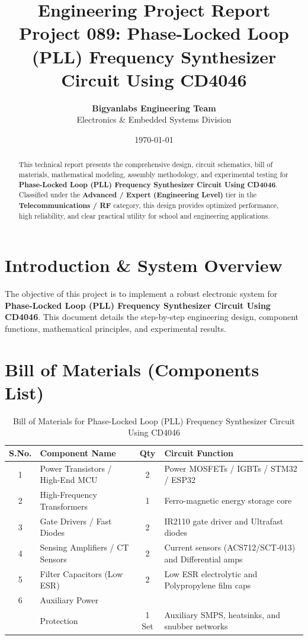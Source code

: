 \documentclass[11pt,a4paper]{article}
\title{\textbf{\Huge Engineering Project Report}\\[0.5em] \Large Project 089: Phase-Locked Loop (PLL) Frequency Synthesizer Circuit Using CD4046}
\author{\textbf{Bigyanlabs Engineering Team}\\ Electronics \& Embedded Systems Division}
\date{\today}
\begin{document}
\maketitle
\thispagestyle{empty}

\begin{abstract}
This technical report presents the comprehensive design, circuit schematics, bill of materials, mathematical modeling, assembly methodology, and experimental testing for \textbf{Phase-Locked Loop (PLL) Frequency Synthesizer Circuit Using CD4046}. Classified under the \textbf{Advanced / Expert (Engineering Level)} tier in the \textbf{Telecommunications / RF} category, this design provides optimized performance, high reliability, and clear practical utility for school and engineering applications.
\end{abstract}

\newpage
\tableofcontents
\newpage

\section{Introduction \& System Overview}
The objective of this project is to implement a robust electronic system for \textbf{Phase-Locked Loop (PLL) Frequency Synthesizer Circuit Using CD4046}. This document details the step-by-step engineering design, component functions, mathematical principles, and experimental results.

\section{Bill of Materials (Components List)}
\begin{table}[h!]
\centering
\caption{Bill of Materials for Phase-Locked Loop (PLL) Frequency Synthesizer Circuit Using CD4046}
\vspace{0.5em}
\begin{tabular}{clcp{7cm}}
\toprule
\textbf{S.No.} & \textbf{Component Name} & \textbf{Qty} & \textbf{Circuit Function} \\
\midrule
1 & Power Transistors / High-End MCU & 2 & Power MOSFETs / IGBTs / STM32 / ESP32 \\
2 & High-Frequency Transformers & 1 & Ferro-magnetic energy storage core \\
3 & Gate Drivers / Fast Diodes & 2 & IR2110 gate driver and Ultrafast diodes \\
4 & Sensing Amplifiers / CT Sensors & 2 & Current sensors (ACS712/SCT-013) and Differential amps \\
5 & Filter Capacitors (Low ESR) & 2 & Low ESR electrolytic and Polypropylene film caps \\
6 & Auxiliary Power \\& Protection & 1 Set & Auxiliary SMPS, heatsinks, and snubber networks \\
\bottomrule
\end{tabular}
\end{table}
\end{document}
